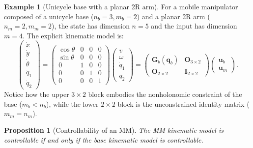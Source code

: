 \documentclass[11pt,a4paper]{article}
\newcommand{\qbase}{\bm{q}_b}
\newcommand{\ubase}{\bm{u}_b}
\newcommand{\uarm}{\bm{u}_m}
\newcommand{\Gbase}{\bm{G}_b}
\theoremstyle{plain}
\newtheorem{proposition}[theorem]{Proposition}
\theoremstyle{definition}
\newtheorem{example}[theorem]{Example}
\theoremstyle{remark}
\begin{document}
\begin{example}[Unicycle base with a planar 2R arm]
For a mobile manipulator composed of a unicycle base ($n_b = 3, m_b = 2$) and a planar 2R arm ($n_m = 2, m_m = 2$), the state has dimension $n = 5$ and the input has dimension $m = 4$. The explicit kinematic model is:
\[
\begin{pmatrix}\dot x\\ \dot y\\ \dot\theta\\ \dot q_1\\ \dot q_2\end{pmatrix}
= \begin{pmatrix}
\cos\theta & 0 & 0 & 0\\
\sin\theta & 0 & 0 & 0\\
0 & 1 & 0 & 0\\
0 & 0 & 1 & 0\\
0 & 0 & 0 & 1
\end{pmatrix}
\begin{pmatrix}v\\ \omega\\ \dot q_1\\ \dot q_2\end{pmatrix}
= \begin{pmatrix}\Gbase(\qbase) & \bm O_{3\times 2}\\ \bm O_{2\times 2} & \bm I_{2\times 2}\end{pmatrix}
\begin{pmatrix}\ubase\\ \uarm\end{pmatrix}.
\]
Notice how the upper $3\times 2$ block embodies the nonholonomic constraint of the base ($m_b < n_b$), while the lower $2\times 2$ block is the unconstrained identity matrix ($m_m = n_m$).
\end{example}

\begin{proposition}[Controllability of an MM]\label{prop:ctrl}
The MM kinematic model is controllable if and only if the base kinematic model is controllable.
\end{proposition}
\end{document}
